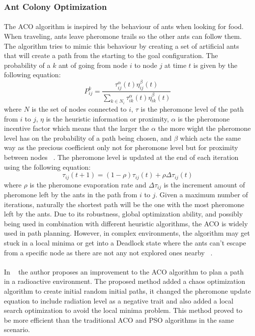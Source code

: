 \subsubsection{Ant Colony Optimization}
\label{subsubsec:ACO}
\paragraph{}The \gls{ACO} algorithm is inspired by the behaviour of ants when looking for food.
When traveling, ants leave pheromone trails so the other ants can follow them. The algorithm tries to mimic this behaviour
by creating a set of artificial ants that will create a path from the starting to the goal configuration. The probability of
a $k$ ant of going from node $i$ to node $j$ at time $t$ is given by the following equation:
\begin{equation}
    P^k_{ij} = \frac{\tau_{ij}^{\alpha}(t)\eta_{ij}^{\beta}(t)}{\sum_{k \in N_{i}}\tau_{ik}^{\alpha}(t)\eta_{ik}^{\beta}(t)}
\end{equation}
where $N$ is the set of nodes connected to $i$, $\tau$ is the pheromone level of the path from $i$ to $j$, $\eta$ is the heuristic information or 
proximity, $\alpha$ is the pheromone incentive factor which means that the larger the $\alpha$ the more wight the pheromone level has
on the probability of a path being chosen, and $\beta$ which acts the same way as the precious coefficient only not for pheromone level
but for proximity between nodes ~\cite{aocet1}. The pheromone level is updated at the end of each iteration using the following equation:
\begin{equation}
    \tau_{ij}(t+1) = (1 - \rho)\tau_{ij}(t) + \rho\Delta\tau_{ij}(t)
\end{equation}
where $\rho$ is the pheromone evaporation rate and $\Delta\tau_{ij}$ is the increment amount of pheromone left by the ants in the path from $i$ to $j$.
Given a maximum number of iterations, naturally the shortest path will be the one with the most pheromone left by the ants.
Due to its robustness, global optimization ability, and possibly being used in combination with different heuristic 
algorithms, the \gls{ACO} is widely used in path planning. However, in complex environments, the algorithm may get stuck in a local minima or get into a 
Deadlock state where the ants can't escape from a specific node as there are not any not explored ones nearby ~\cite{aocet2}.

\paragraph{}In ~\cite{XIE2022104076} the author proposes an improvement to the \gls{ACO} algorithm to plan a path in a radioactive environment. 
The proposed method added a chaos optimization algorithm to create initial random initial paths, it changed the pheromone
update equation to include radiation level as a negative trait and also added a local search optimization to avoid the local minima problem. 
This method proved to be more efficient than the traditional \gls{ACO} and \gls{PSO} algorithms in the same scenario. 
